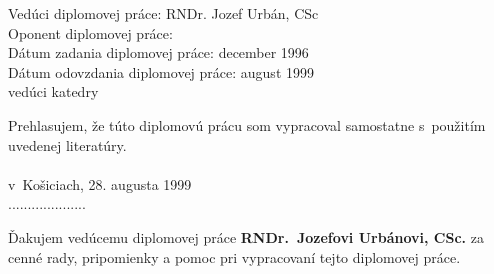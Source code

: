 \begin{titlepage}
{            \vspace*{1cm}
            Vedúci diplomovej práce: RNDr. Jozef Urbán, CSc \\

            Oponent diplomovej práce: \\

            Dátum zadania diplomovej práce: december 1996 \\

            Dátum odovzdania diplomovej práce: august 1999 \\

            \vspace{1cm}
            \hspace*{10cm}
            vedúci katedry }
\end{titlepage}
\begin{titlepage}
  \parindent 0cm
  \vspace*{8cm}  Prehlasujem, že túto diplomovú prácu
  som vypracoval samostatne s~použitím uvedenej literatúry. \\
  \\ v~Košiciach, 28. augusta 1999 \\

  \hspace{9cm} ....................
\end{titlepage}
\begin{titlepage}
  \parindent 0cm
  \vspace*{8cm} Ďakujem vedúcemu diplomovej práce {\bf
    RNDr.~Jozefovi Urbánovi, CSc.} za cenné rady, pripomienky a pomoc pri
  vypracovaní tejto diplomovej práce.
\end{titlepage}
\tableofcontents \newpage
{}
